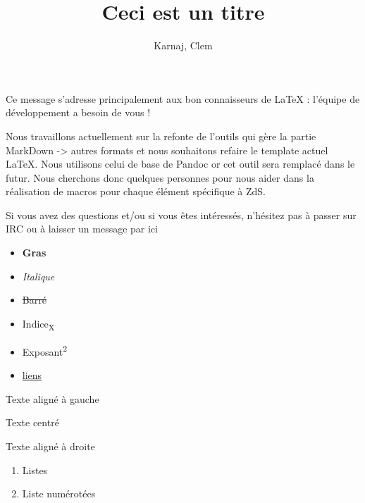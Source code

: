 \documentclass[small]{zmdocument}
\title{Ceci est un titre}
\author{Karnaj, Clem}
\begin{document}
\maketitle
\tableofcontents


Ce message s’adresse principalement aux bon connaisseurs de LaTeX : l’équipe de développement a besoin de vous ! \clinSmiley{}

Nous travaillons actuellement sur la refonte de l’outils qui gère la partie MarkDown -> autres formats et nous souhaitons refaire le template actuel LaTeX. Nous utilisons celui de base de Pandoc or cet outil sera remplacé dans le futur. Nous cherchons donc quelques personnes pour nous aider dans la réalisation de macros pour chaque élément spécifique à ZdS.

Si vous avez des questions et/ou si vous êtes intéressés, n’hésitez pas à passer sur IRC ou à laisser un message par ici \diableSmiley{}


\begin{itemize}
\item \textbf{Gras}
\item \textit{Italique}
\item \sout{Barré}
\item Indice\textsubscript{X}
\item Exposant\textsuperscript{2}
\item \href{zestedesavoir.com}{liens}
\end{itemize}

\begin{flushleft}
Texte aligné à gauche
\end{flushleft}

\begin{center}
Texte centré
\end{center}

\begin{flushright}
Texte aligné à droite
\end{flushright}

\begin{enumerate}
\item Listes
\item Liste numérotées
\end{enumerate}

\end{document}
